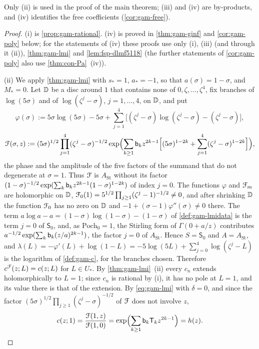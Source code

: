 Only (ii) is used in the proof of the main theorem; (iii) and (iv) are by-products, and (iv) identifies the free coefficients (\cref{cor:gam-free}).

\begin{proof}
(i) is \cref{prop:gam-rational}. (iv) is proved in \cref{thm:gam-ginf} and \cref{cor:gam-poly} below; for the statements of (iv) these proofs use only (i), (iii) (and through it (ii)), \cref{thm:gam-lmi} and \cref{lem:fsp-dlmf5118} (the further statements of \cref{cor:gam-poly} also use \cref{thm:con-Pa}~(iv)).

(ii) We apply \cref{thm:gam-lmi} with $s_*=1$, $a_*=-1$, so that $a(\sigma)=1-\sigma$, and $M_*=0$. Let $\mathbb{D}$ be a disc around $1$ that contains none of $0,\zeta,\dots,\zeta^4$, fix branches of $\log(5\sigma)$ and of $\log(\zeta^j-\sigma)$, $j=1,\dots,4$, on $\mathbb{D}$, and put
\[
\varphi(\sigma):=5\sigma\log(5\sigma)-5\sigma+\sum_{j=1}^4\bigl[(\zeta^j-\sigma)\log(\zeta^j-\sigma)-(\zeta^j-\sigma)\bigr],
\]
\[
\mathcal{F}(\sigma,z):=(5\sigma)^{1/2}\prod_{j=1}^4(\zeta^j-\sigma)^{-1/2}\exp\Bigl(\sum_{k\geq 1}\mathsf{b}_kz^{2k-1}\Bigl[(5\sigma)^{1-2k}+\sum_{j=1}^4(\zeta^j-\sigma)^{1-2k}\Bigr]\Bigr),
\]
the phase and the amplitude of the five factors of the summand that do not degenerate at $\sigma=1$. Thus $\mathcal{F}$ is $A_{\mathrm{St}}$ without its factor $(1-\sigma)^{-1/2}\exp(\sum_k\mathsf{b}_kz^{2k-1}(1-\sigma)^{1-2k})$ of index $j=0$. The functions $\varphi$ and $\mathcal{F}_m$ are holomorphic on $\mathbb{D}$, $\mathcal{F}_0(1)=5^{1/2}\prod_{j\geq 1}(\zeta^j-1)^{-1/2}\neq 0$, and after shrinking $\mathbb{D}$ the function $\mathcal{F}_0$ has no zero on $\mathbb{D}$ and $-1+(\sigma-1)\varphi''(\sigma)\neq 0$ there. The term $a\log a-a=(1-\sigma)\log(1-\sigma)-(1-\sigma)$ of \cref{def:gam-lmidata} is the term $j=0$ of $\mathsf S_0$, and, as $\mathrm{Poch}_0=1$, the Stirling form of $\Gamma(0+a/z)$ contributes $a^{-1/2}\exp(\sum_k\mathsf{b}_k(z/a)^{2k-1})$, the factor $j=0$ of $A_{\mathrm{St}}$. Hence $S=\mathsf S_0$ and $A=A_{\mathrm{St}}$, and $\lambda(L)=-\varphi'(L)+\log(1-L)=-5\log(5L)+\sum_{j=0}^4\log(\zeta^j-L)$ is the logarithm of \cref{def:gam-c}, for the branches chosen. Therefore $c^{\mathcal{F}}(z;L)=c(z;L)$ for $L\in U_*$. By \cref{thm:gam-lmi}~(ii) every $c_n$ extends holomorphically to $L=1$; since $c_n$ is rational by (i), it has no pole at $L=1$, and its value there is that of the extension. By \eqref{eq:gam-lmi} with $\delta=0$, and since the factor $(5\sigma)^{1/2}\prod_{j\geq 1}(\zeta^j-\sigma)^{-1/2}$ of $\mathcal{F}$ does not involve $z$,
\[
c(z;1)=\frac{\mathcal{F}(1,z)}{\mathcal{F}(1,0)}=\exp\Bigl(\sum_{k\geq 1}\mathsf{b}_k\mathsf T_kz^{2k-1}\Bigr)=h(z).
\]


\end{proof}
